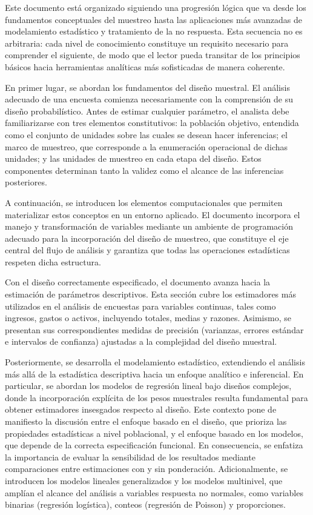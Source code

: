 \documentclass[
  spanish,
  12pt,
]{book}
\begin{document}
Este documento está organizado siguiendo una progresión lógica que va desde los fundamentos conceptuales del muestreo hasta las aplicaciones más avanzadas de modelamiento estadístico y tratamiento de la no respuesta. Esta secuencia no es arbitraria: cada nivel de conocimiento constituye un requisito necesario para comprender el siguiente, de modo que el lector pueda transitar de los principios básicos hacia herramientas analíticas más sofisticadas de manera coherente.

En primer lugar, se abordan los fundamentos del diseño muestral. El análisis adecuado de una encuesta comienza necesariamente con la comprensión de su diseño probabilístico. Antes de estimar cualquier parámetro, el analista debe familiarizarse con tres elementos constitutivos: la población objetivo, entendida como el conjunto de unidades sobre las cuales se desean hacer inferencias; el marco de muestreo, que corresponde a la enumeración operacional de dichas unidades; y las unidades de muestreo en cada etapa del diseño. Estos componentes determinan tanto la validez como el alcance de las inferencias posteriores.

A continuación, se introducen los elementos computacionales que permiten materializar estos conceptos en un entorno aplicado. El documento incorpora el manejo y transformación de variables mediante un ambiente de programación adecuado para la incorporación del diseño de muestreo, que constituye el eje central del flujo de análisis y garantiza que todas las operaciones estadísticas respeten dicha estructura.

Con el diseño correctamente especificado, el documento avanza hacia la estimación de parámetros descriptivos. Esta sección cubre los estimadores más utilizados en el análisis de encuestas para variables continuas, tales como ingresos, gastos o activos, incluyendo totales, medias y razones. Asimismo, se presentan sus correspondientes medidas de precisión (varianzas, errores estándar e intervalos de confianza) ajustadas a la complejidad del diseño muestral.

Posteriormente, se desarrolla el modelamiento estadístico, extendiendo el análisis más allá de la estadística descriptiva hacia un enfoque analítico e inferencial. En particular, se abordan los modelos de regresión lineal bajo diseños complejos, donde la incorporación explícita de los pesos muestrales resulta fundamental para obtener estimadores insesgados respecto al diseño. Este contexto pone de manifiesto la discusión entre el enfoque basado en el diseño, que prioriza las propiedades estadísticas a nivel poblacional, y el enfoque basado en los modelos, que depende de la correcta especificación funcional. En consecuencia, se enfatiza la importancia de evaluar la sensibilidad de los resultados mediante comparaciones entre estimaciones con y sin ponderación. Adicionalmente, se introducen los modelos lineales generalizados y los modelos multinivel, que amplían el alcance del análisis a variables respuesta no normales, como variables binarias (regresión logística), conteos (regresión de Poisson) y proporciones.
\end{document}
